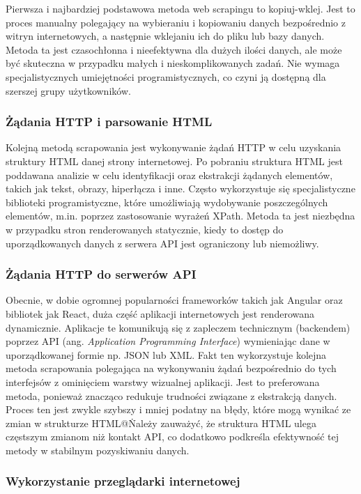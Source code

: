 Pierwsza i najbardziej podstawowa metoda web scrapingu to kopiuj-wklej.
Jest to proces manualny polegający na wybieraniu i kopiowaniu danych bezpośrednio z witryn internetowych, a następnie wklejaniu ich do pliku lub bazy danych.
Metoda ta jest czasochłonna i nieefektywna dla dużych ilości danych, ale może być skuteczna w przypadku małych i nieskomplikowanych zadań\cite{state-of-art}.
Nie wymaga specjalistycznych umiejętności programistycznych, co czyni ją dostępną dla szerszej grupy użytkowników.

\subsubsection{Żądania HTTP i parsowanie HTML}

Kolejną metodą scrapowania jest wykonywanie żądań HTTP w celu uzyskania struktury HTML danej strony internetowej.
Po pobraniu struktura HTML jest poddawana analizie w celu identyfikacji oraz ekstrakcji żądanych elementów, takich jak tekst, obrazy, hiperłącza i inne.
Często wykorzystuje się specjalistyczne biblioteki programistyczne, które umożliwiają wydobywanie poszczególnych elementów, m.in. poprzez zastosowanie wyrażeń XPath.
Metoda ta jest niezbędna w przypadku stron renderowanych statycznie, kiedy to dostęp do uporządkowanych danych z serwera API jest ograniczony lub niemożliwy.

\subsubsection{Żądania HTTP do serwerów API}

Obecnie, w dobie ogromnej popularności frameworków takich jak Angular oraz bibliotek jak React, duża część aplikacji internetowych jest renderowana dynamicznie.
Aplikacje te komunikują się z zapleczem technicznym (backendem) poprzez API (ang. \emph{Application Programming Interface}) wymieniając dane w uporządkowanej formie np. JSON lub XML.
Fakt ten wykorzystuje kolejna metoda scrapowania polegająca na wykonywaniu żądań bezpośrednio do tych interfejsów z ominięciem warstwy wizualnej aplikacji.
Jest to preferowana metoda, ponieważ znacząco redukuje trudności związane z ekstrakcją danych.
Proces ten jest zwykle szybszy i mniej podatny na błędy, które mogą wynikać ze zmian w strukturze HTML@\.
Należy zauważyć, że struktura HTML ulega częstszym zmianom niż kontakt API, co dodatkowo podkreśla efektywność tej metody w stabilnym pozyskiwaniu danych.

\subsubsection{Wykorzystanie przeglądarki internetowej}\label{subsubsec:browser-scraping-theory}

